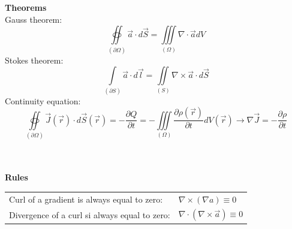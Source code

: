 \textbf{\\ \\ Theorems\\}
	Gauss theorem:
	\begin{equation*}
		\oiint\limits_{\left(\partial \Omega\right)} \vec{a} \cdot d\vec{S} = \iiint\limits_{\left(\Omega\right)} \nabla \cdot \vec{a}dV
	\end{equation*}
	Stokes theorem:
	\begin{equation*}
		\int\limits_{\left(\partial S\right)} \vec{a} \cdot d\vec{l} = \iint\limits_{\left(S\right)} \nabla \times \vec{a} \cdot d\vec{S}
	\end{equation*}
	Continuity equation:
	\begin{equation*}
		\oiint\limits_{\left(\partial \Omega\right)} \vec{J}\left(\vec{r}\right)\cdot d\vec{S}\left(\vec{r}\right) = -\frac{\partial Q}{\partial t} = -\iiint\limits_{\left(\Omega\right)} \frac{\partial \rho\left(\vec{r}\right)}{\partial t}dV\left(\vec{r}\right) \rightarrow \nabla \vec{J} = - \frac{\partial \rho}{\partial t}
	\end{equation*}

\textbf{\\ \\ Rules \\}
\begin{tabular}{ll}
	Curl of a gradient is always equal to zero: & $\nabla \times \left(\nabla a\right) \equiv 0$ \\
	Divergence of a curl si always equal to zero: & $\nabla \cdot \left(\nabla \times \vec{a}\right) \equiv 0$\\
\end{tabular}